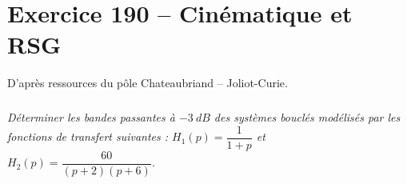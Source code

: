 \section*{Exercice 190 -- Cinématique et RSG}
\setcounter{exo}{0}

D'après ressources du pôle Chateaubriand -- Joliot-Curie.



\subparagraph{}
\textit{Déterminer les bandes passantes à $\SI{-3}{dB}$ des systèmes bouclés modélisés par les fonctions de transfert
suivantes : $H_1(p)=\dfrac{1}{1+p}$ et $H_2(p)=\dfrac{60}{\left(p+2\right)\left(p+6\right)}$.}
\ifprof
\begin{corrige}

\end{corrige}
\else
\fi
